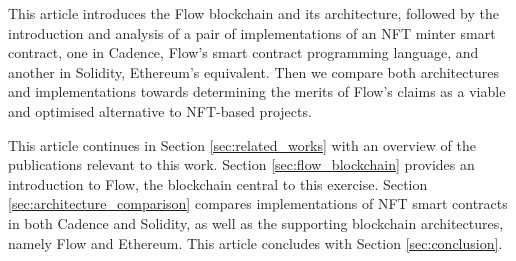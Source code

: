 \documentclass[../NFTComp_IEEE.tex]{subfiles}
\begin{document}
\par
This article introduces the Flow blockchain and its architecture, followed by the introduction and analysis of a pair of implementations of an NFT minter smart contract, one in Cadence, Flow's smart contract programming language, and another in Solidity, Ethereum's equivalent. Then we compare both architectures and implementations towards determining the merits of Flow's claims as a viable and optimised alternative to NFT-based projects.
\par
This article continues in Section \ref{sec:related_works} with an overview of the publications relevant to this work. Section \ref{sec:flow_blockchain} provides an introduction to Flow, the blockchain central to this exercise. Section \ref{sec:architecture_comparison} compares implementations of NFT smart contracts in both Cadence and Solidity, as well as the supporting blockchain architectures, namely Flow and Ethereum. This article concludes with Section \ref{sec:conclusion}.
\end{document}
